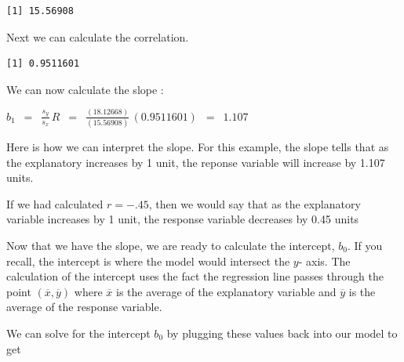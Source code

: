 \documentclass[
  letterpaper,
  DIV=11,
  numbers=noendperiod]{scrreprt}
\newenvironment{Shaded}{\begin{snugshade}}{\end{snugshade}}
\newcommand{\FunctionTok}[1]{\textcolor[rgb]{0.28,0.35,0.67}{#1}}
\newcommand{\NormalTok}[1]{\textcolor[rgb]{0.00,0.23,0.31}{#1}}
\newcommand{\SpecialCharTok}[1]{\textcolor[rgb]{0.37,0.37,0.37}{#1}}
\begin{document}
\begin{verbatim}
[1] 15.56908
\end{verbatim}

Next we can calculate the correlation.

\begin{Shaded}
\end{Shaded}

\begin{verbatim}
[1] 0.9511601
\end{verbatim}

We can now calculate the slope :

\(\displaystyle{b_1\,\,\, = \,\,\,\frac{s_y}{s_x}\, R\,\,\, =
\,\,\,\frac{(18.12668)}{(15.56908)}\,(0.9511601)\,\,\, =\,\,\, 1.107 }\)

\begin{tcolorbox}[enhanced jigsaw, colbacktitle=quarto-callout-tip-color!10!white, colframe=quarto-callout-tip-color-frame, opacitybacktitle=0.6, rightrule=.15mm, title=\textcolor{quarto-callout-tip-color}{\faLightbulb}\hspace{0.5em}{Interpreting the Slope}, colback=white, coltitle=black, breakable, leftrule=.75mm, toptitle=1mm, bottomrule=.15mm, opacityback=0, bottomtitle=1mm, titlerule=0mm, left=2mm, toprule=.15mm, arc=.35mm]

Here is how we can interpret the slope. For this example, the slope
tells that as the explanatory increases by 1 unit, the reponse variable
will increase by 1.107 units.

If we had calculated \(r = -.45\), then we would say that as the
explanatory variable increases by 1 unit, the response variable
decreases by 0.45 units

\end{tcolorbox}

Now that we have the slope, we are ready to calculate the intercept,
\(b_0\). If you recall, the intercept is where the model would intersect
the \(y\)- axis. The calculation of the intercept uses the fact the
regression line passes through the point
\(( \overline{x}, \overline{y})\) where \(\overline{x}\) is the average
of the explanatory variable and \(\overline{y}\) is the average of the
response variable.

We can solve for the intercept \(b_0\) by plugging these values back
into our model to get
\end{document}
